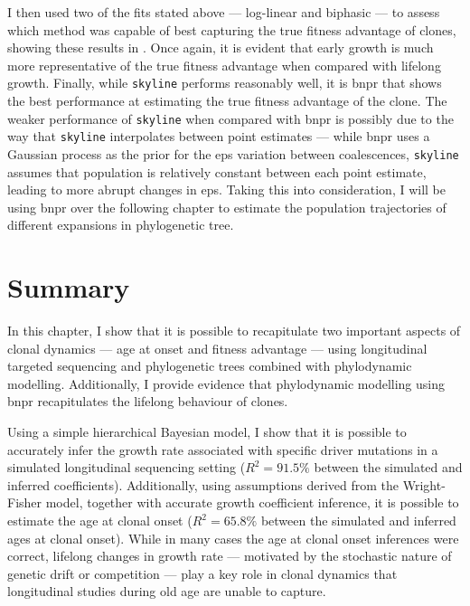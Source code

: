 I then used two of the fits stated above --- log-linear and biphasic --- to assess which method was capable of best capturing the true fitness advantage of clones, showing these results in . Once again, it is evident that early growth is much more representative of the true fitness advantage when compared with lifelong growth. Finally, while \texttt{skyline} performs reasonably well, it is \ac{bnpr} that shows the best performance at estimating the true fitness advantage of the clone. The weaker performance of \texttt{skyline} when compared with \ac{bnpr} is possibly due to the way that \texttt{skyline} interpolates between point estimates --- while \ac{bnpr} uses a Gaussian process as the prior for the \ac{eps} variation between coalescences, \texttt{skyline} assumes that population is relatively constant between each point estimate, leading to more abrupt changes in \ac{eps}. Taking this into consideration, I will be using \ac{bnpr} over the following chapter to estimate the population trajectories of different expansions in phylogenetic tree.

\begin{figure}[!ht]
	\label{fig:compare-phylo-traj-heatmap}
\end{figure}

\section{Summary}

In this chapter, I show that it is possible to recapitulate two important aspects of clonal dynamics --- age at onset and fitness advantage --- using longitudinal targeted sequencing and phylogenetic trees combined with phylodynamic modelling. Additionally, I provide evidence that phylodynamic modelling using \ac{bnpr} recapitulates the lifelong behaviour of clones.

Using a simple hierarchical Bayesian model, I show that it is possible to accurately infer the growth rate associated with specific driver mutations in a simulated longitudinal sequencing setting ($R^2 = 91.5\%$ between the simulated and inferred coefficients). Additionally, using assumptions derived from the Wright-Fisher model, together with accurate growth coefficient inference, it is possible to estimate the age at clonal onset ($R^2 = 65.8\%$ between the simulated and inferred ages at clonal onset). While in many cases the age at clonal onset inferences were correct, lifelong changes in growth rate --- motivated by the stochastic nature of genetic drift or competition --- play a key role in clonal dynamics that longitudinal studies during old age are unable to capture.

